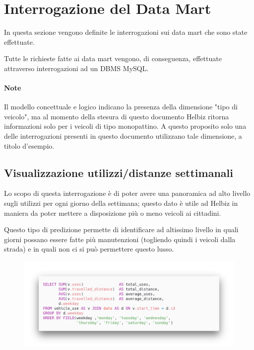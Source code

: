 \chapter{Interrogazione del Data Mart}
In questa sezione vengono definite le interrogazioni sui data mart che sono state effettuate.

Tutte le richieste fatte ai data mart vengono, di conseguenza, effettuate attraverso interrogazioni ad un DBMS MySQL.

\subsubsection{Note}
Il modello concettuale e logico indicano la presenza della dimensione "tipo di veicolo", ma al momento della stesura
di questo documento Helbiz ritorna informazioni solo per i veicoli di tipo monopattino.
A questo proposito solo una delle interrogazioni presenti in questo documento utilizzano tale dimensione, a titolo d'esempio.




\section{Visualizzazione utilizzi/distanze settimanali}
Lo scopo di questa interrogazione è di poter avere una panoramica ad alto livello
sugli utilizzi per ogni giorno della settimana; questo dato è utile ad 
Helbiz in maniera da poter mettere a disposizione più o meno veicoli ai cittadini.

Questo tipo di predizione permette di identificare ad altissimo livello
in quali giorni possano essere fatte più manutenzioni (togliendo quindi i veicoli dalla strada)
e in quali non ci si può permettere questo lusso.
\begin{figure}[H]                                                                                                                                                            
\centering                                                                                                                                                                   
\includegraphics[width=\textwidth]{images/query1}                                                                                                                                   
\label{fig:query1}                                                                                                                                                           
\end{figure}


